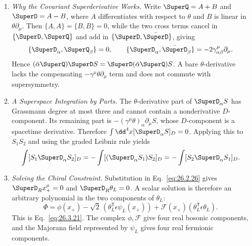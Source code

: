 \begin{enumerate}
  \begin{enumerate}
    \item \emph{Why the Covariant Superderivative Works.}
    Write \(\SuperQ=A+B\) and \(\SuperD=A-B\), where \(A\) differentiates
      with respect to \(\theta\) and \(B\) is linear in \(\theta\partial_\mu\).
      Then \(\{A,A\}=\{B,B\}=0\), while the two cross terms cancel in
      \(\{\SuperD,\SuperQ\}\) and add in
      \(\{\SuperD,\bar{\SuperD}\}\), giving
      \[
        \{\SuperD_\alpha,\SuperQ_\beta\}=0,\qquad
        \{\SuperD_\alpha,\bar{\SuperD}_\beta\}
          =-2\gamma^\mu_{\alpha\beta}\partial_\mu .
      \]
      Hence \((\bar\alpha\SuperQ)\SuperD S=\SuperD(\bar\alpha\SuperQ)S\).
      A bare \(\theta\)-derivative lacks the compensating
      \(-\gamma^\mu\theta\partial_\mu\) term and does not commute with
      supersymmetry.
    \item \emph{A Superspace Integration by Parts.}
    The \(\theta\)-derivative part of \(\SuperD_\alpha S\) has Grassmann
      degree at most three and cannot contain a nonderivative \(D\)-component.
      Its remaining part is
      \(-(\gamma^\mu\theta)_\alpha\partial_\mu S\), whose \(D\)-component is a
      spacetime derivative.  Therefore
      \(\int \dd^4x[\SuperD_\alpha S]_D=0\).  Applying this to \(S_1S_2\) and
      using the graded Leibniz rule yields
      \[
        \int[S_1\SuperD_\alpha S_2]_D
          =-\int[(\SuperD_\alpha S_1)S_2]_D
          =-\int[S_2\SuperD_\alpha S_1]_D .
      \]
    \item \emph{Solving the Chiral Constraint.}
    Substitution in Eq.~\eqref{eq:26.2.26} gives
      \(\SuperD_Rx_+^\mu=0\) and \(\SuperD_R\theta_L=0\).
      A scalar solution is therefore an arbitrary polynomial in the two
      components of \(\theta_L\):
      \[
        \Phi=\phi(x_+)-\sqrt2\,
          (\theta_L^{\mathsf T}\epsilon\psi_L(x_+))
          +\mathcal F(x_+)(\theta_L^{\mathsf T}\epsilon\theta_L).
      \]
      This is Eq.~\eqref{eq:26.3.21}.  The complex \(\phi,\mathcal F\) give
      four real bosonic components, and the Majorana field represented by
      \(\psi_L\) gives four real fermionic components.
  \end{enumerate}


\end{enumerate}
